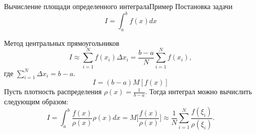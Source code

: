 \documentclass{beamer}
\begin{document}
	\begin{frame}{Вычисление площади определенного интеграла}{Пример}
		Постановка задачи
		\[
		I = \int_{a}^{b} f(x) dx
		\]
		
		Метод центральных прямоугольников
		\[
		I 
		\approx 
		\sum_{i=1}^{N} f(x_i) \Delta x_i 
		=
		\frac{b-a}{N} \sum_{i=1}^{N} f(x_i)
		,
		\]
		где $\sum_{i=1}^{N} \Delta x_i = b - a$.
		\[
		I
		=
		(b - a) M [f(x)]
		\]
		Пусть плотность распределения $\rho(x) = \frac{1}{b-a}$. Тогда интеграл можно вычислить следующим образом:
		\[
		I
		= 
		\int_{a}^{b} \frac{f(x)}{\rho(x)} \rho(x) dx
		= 
		M \Bigg[\frac{f(x)}{\rho(x)}\Bigg] 
		\approx
		\frac{1}{N} \sum_{i=1}^{N} \frac{f(\xi_i)}{\rho(\xi_i)}
		.
		\]
	\end{frame}
\end{document}
